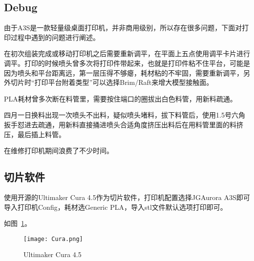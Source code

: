 \subsection{Debug}

由于A3S是一款轻量级桌面打印机，并非商用级别，所以存在很多问题，下面对打印过程中遇到的问题进行阐述。

在初次组装完成或移动打印机之后需要重新调平，在平面上五点使用调平卡片进行调平。打印的时候喷头曾多次将打印件带起来，也就是打印件粘不住平台，可能是因为喷头和平台距离远，第一层压得不够瘪，耗材粘的不牢固，需要重新调平，另外切片时“打印平台附着类型”可以选择Brim/Raft来增大模型接触面。

PLA耗材曾多次断在料管里，需要按住端口的圈拔出白色料管，用新料疏通。

四月一日换料出现一次喷头不出料，疑似喷头堵料，拔下料管后，使用1.5号六角扳手怼进去疏通，用新料直接捅进喷头合适角度挤压出料后在用料管里面的料挤压，最后插上料管。

在维修打印机期间浪费了不少时间。

\subsection{切片软件}

使用开源的Ultimaker Cura 4.5作为切片软件，打印机配置选择JGAurora A3S即可导入打印机Config，耗材选Generic PLA，导入stl文件默认选项打印即可。

如图~\ref{fig:Cura}。

\begin{figure}[htbp]
    \centering
    \texttt{[image: Cura.png]}
    \caption{Ultimaker Cura 4.5}
    \label{fig:Cura}
\end{figure}
